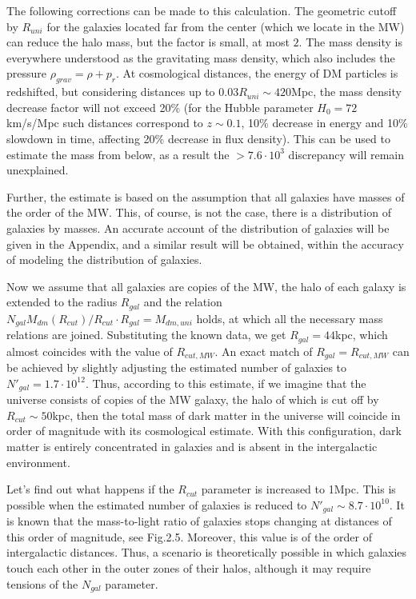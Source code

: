 \documentclass{article}
\begin{document}
The following corrections can be made to this calculation. The geometric cutoff by $ R_ {uni} $ for the galaxies located far from the center (which we locate in the MW) can reduce the halo mass, but the factor is small, at most $ 2 $. The mass density is everywhere understood as the gravitating mass density, which also includes the pressure $ \rho_ {grav} = \rho + p_r $. At cosmological distances, the energy of DM particles is redshifted, but considering distances up to $ 0.03R_ {uni} \sim420 $Mpc, the mass density decrease factor will not exceed 20\% (for the Hubble parameter $ H_0 = 72 $km/s/Mpc such distances correspond to $ z \sim0.1 $, 10\% decrease in energy and 10\% slowdown in time, affecting 20\% decrease in flux density). This can be used to estimate the mass from below, as a result the $> 7.6 \cdot10 ^ 3 $ discrepancy will remain unexplained.

Further, the estimate is based on the assumption that all galaxies have masses of the order of the MW. This, of course, is not the case, there is a distribution of galaxies by masses. An accurate account of the distribution of galaxies will be given in the Appendix, and a similar result will be obtained, within the accuracy of modeling the distribution of galaxies.

Now we assume that all galaxies are copies of the MW, the halo of each galaxy is extended to the radius $ R_ {gal} $ and the relation $ N_ {gal} M_ {dm} (R_ {cut}) / R_ {cut} \cdot R_ {gal} = M_ {dm, uni} $ holds, at which all the necessary mass relations are joined. Substituting the known data, we get $ R_ {gal} = 44 $kpc, which almost coincides with the value of $ R_ {cut, MW} $. An exact match of $ R_ {gal} = R_ {cut, MW} $ can be achieved by slightly adjusting the estimated number of galaxies to $ N '_ {gal} = 1.7 \cdot10 ^ {12} $. Thus, according to this estimate, if we imagine that the universe consists of copies of the MW galaxy, the halo of which is cut off by $ R_ {cut} \sim50 $kpc, then the total mass of dark matter in the universe will coincide in order of magnitude with its cosmological estimate. With this configuration, dark matter is entirely concentrated in galaxies and is absent in the intergalactic environment.

Let's find out what happens if the $ R_ {cut} $ parameter is increased to 1Mpc. This is possible when the estimated number of galaxies is reduced to $ N '_ {gal} \sim8.7 \cdot10 ^ {10} $. It is known that the mass-to-light ratio of galaxies stops changing at distances of this order of magnitude, see \cite {Dodelson} Fig.2.5. Moreover, this value is of the order of intergalactic distances. Thus, a scenario is theoretically possible in which galaxies touch each other in the outer zones of their halos, although it may require tensions of the $ N_ {gal} $ parameter.
\end{document}
